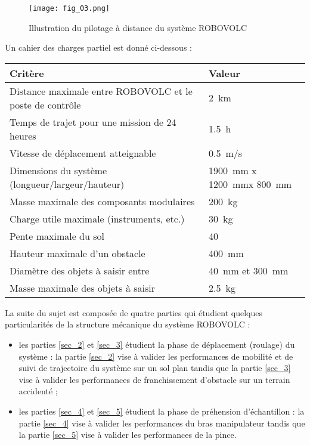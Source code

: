 

\begin{figure}[H]
\centering
\texttt{[image: fig\_03.png]}
\caption{Illustration du pilotage à distance du système ROBOVOLC\label{fig_03}}
\end{figure}

Un cahier des charges partiel est donné ci-dessous :

\begin{center}
\begin{tabular}{ll}
\hline
\textbf{Critère} & \textbf{Valeur} \\ \hline \hline
Distance maximale entre ROBOVOLC et le poste de contrôle & \SI{2}{km} \\ \hline  
Temps de trajet pour une mission de 24 heures 		& \SI{1,5}{h} \\ \hline 
Vitesse de déplacement atteignable 				& \SI{0,5}{m/s} \\ \hline 
Dimensions du système (longueur/largeur/hauteur) 		& \SI{1900}{mm} x \SI{1200}{mm}x \SI{800}{mm}\\ \hline 
Masse maximale des composants modulaires 			& \SI{200}{kg} \\ \hline 
Charge utile maximale (instruments, etc.) 			& \SI{30}{kg} \\ \hline 
Pente maximale du sol 						& 40\degres \\ \hline 
Hauteur maximale d'un obstacle 					& \SI{400}{mm} \\ \hline 
Diamètre des objets à saisir entre 				& \SI{40}{mm} et \SI{300}{mm} \\ \hline 
Masse maximale des objets à saisir 				& \SI{2,5}{kg} \\ \hline 
\end{tabular}
\end{center}




La suite du sujet est composée de quatre parties qui étudient quelques particularités de la
structure mécanique du système ROBOVOLC :
\begin{itemize}
\item les parties \ref{sec_2} et \ref{sec_3} étudient la phase de déplacement (roulage) du système : la partie \ref{sec_2} vise
à valider les performances de mobilité et de suivi de trajectoire du système sur un sol plan
tandis que la partie \ref{sec_3} vise à valider les performances de franchissement d'obstacle sur un
terrain accidenté ;
\item les parties \ref{sec_4} et \ref{sec_5} étudient la phase de préhension d'échantillon : la partie \ref{sec_4} vise à valider
les performances du bras manipulateur tandis que la partie \ref{sec_5} vise à valider les
performances de la pince.
\end{itemize}


